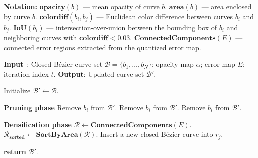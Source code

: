 \begin{algorithm}[t]
\caption{\textbf{Adaptive Pruning and Densification for Closed Bézier Curves}}
\label{alg:adaptive_pruning_densification}
\begin{algorithmic} %


\STATE \textbf{Notation:}
\STATE \quad $\mathbf{opacity}(b)$ — mean opacity of curve $b$.
\STATE \quad $\mathbf{area}(b)$ — area enclosed by curve $b$.
\STATE \quad $\mathbf{colordiff}(b_i,b_j)$ — Euclidean color difference between curves $b_i$ and $b_j$.
\STATE \quad $\mathbf{IoU}(b_i)$ — intersection-over-union between the bounding box of $b_i$ and neighboring curves with $\mathbf{colordiff}<0.03$.
\STATE \quad $\mathbf{ConnectedComponents}(E)$ — connected error regions extracted from the quantized error map.

\STATE {\rule{\linewidth}{0.5pt}}


\STATE \textbf{Input}~: Closed Bézier curve set $\mathcal{B}=\{b_1,\dots,b_N\}$; opacity map $\alpha$; error map $E$; iteration index $t$.
\STATE \textbf{Output}: Updated curve set $\mathcal{B}'$.



\STATE Initialize $\mathcal{B}' \leftarrow \mathcal{B}$.

\STATE \textbf{Pruning phase}
    \STATE Remove $b_i$ from $\mathcal{B}'$. 
  \ENDIF
    \STATE Remove $b_i$ from $\mathcal{B}'$. 
  \ENDIF
    \STATE Remove $b_i$ from $\mathcal{B}'$. 
  \ENDIF
\ENDFOR

\STATE \textbf{Densification phase}
\STATE $\mathcal{R} \leftarrow \mathbf{ConnectedComponents}(E)$.
\STATE $\mathcal{R}_{\mathbf{sorted}} \leftarrow \mathbf{SortByArea}(\mathcal{R})$.
    \STATE Insert a new closed Bézier curve into $r_j$.
  \ENDIF
\ENDFOR

\STATE \textbf{return} $\mathcal{B}'$.
\end{algorithmic}
\end{algorithm}



